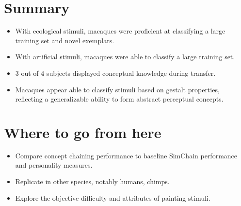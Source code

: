 \documentclass[a0,portrait]{a0poster}
\begin{document}
\begin{multicols}{2}

\color{Maroon} %
\color{Black}


\section*{Summary}

\begin{itemize}
\item With ecological stimuli, macaques were proficient at classifying a large training set and novel exemplars.
\item With artificial stimuli, macaques were able to classify a large training set.
\item 3 out of 4 subjects displayed conceptual knowledge during transfer.
\item Macaques appear able to classify stimuli based on gestalt properties, reflecting a generalizable ability to form abstract perceptual concepts.
\end{itemize}

\color{Black} %


\color{Maroon}
\section*{Where to go from here}

\begin{itemize}
\item Compare concept chaining performance to baseline SimChain performance and personality measures.
\item Replicate in other species, notably humans, chimps.
\item Explore the objective difficulty and attributes of painting stimuli.
\end{itemize}	



\end{multicols}
\end{document}
